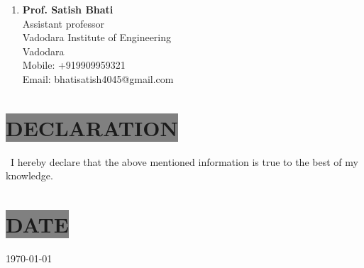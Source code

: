 \documentclass{res}
\begin{document}
\begin{resume}
\begin{enumerate}
\item \textbf{Prof. Satish Bhati}\\ Assistant professor \\ Vadodara Institute of Engineering \\ Vadodara \\ Mobile: +919909959321 \\ Email: bhatisatish4045@gmail.com

\end{enumerate}



\section{
\colorbox{grey}{DECLARATION}
}
\ I hereby declare that the above mentioned information is true to the best of my knowledge.

\section{
\colorbox{grey}{DATE}
}
\today


\end{resume}
\end{document}
